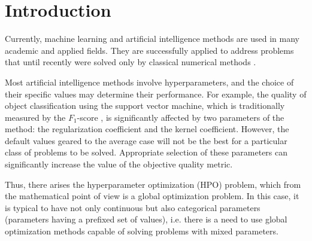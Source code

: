 \documentclass[runningheads]{llncs}
\begin{document}
\section{Introduction}

Currently, machine learning and artificial intelligence methods are used in many academic and applied fields. They are successfully applied to address problems that until recently were solved only by classical numerical methods \cite{Blechschmidt2021,Seleznev2019,Xu2020}. 

Most artificial intelligence methods involve hyperparameters, and the choice of their specific values may determine their performance. For example, the quality of object classification using the support vector machine, which is traditionally measured by the $F_1$-score \cite{NIPS2015}, is significantly affected by two parameters of the method: the regularization coefficient and the kernel coefficient. However, the default values geared to the average case will not be the best for a particular class of problems to be solved. Appropriate selection of these parameters can significantly increase the value of the objective quality metric.

Thus, there arises the hyperparameter optimization (HPO) problem, which from the mathematical point of view is a global optimization problem. In this case, it is typical to have not only continuous but also categorical parameters (parameters having a prefixed set of values), i.e. there is a need to use global optimization methods capable of solving problems with mixed parameters. 
\end{document}

